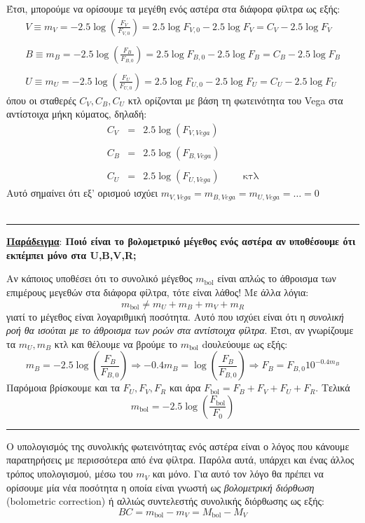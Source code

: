 Έτσι, μπορούμε να ορίσουμε τα μεγέθη ενός αστέρα στα διάφορα φίλτρα ως εξής:
\begin{eqnarray*}
    V \equiv m_V = -2.5 \log \left( \frac{F_V}{F_{V,0}} \right) = 2.5 \log F_{V,0} - 2.5 \log F_V = C_V - 2.5 \log F_V \\\\
    B \equiv m_B = -2.5 \log \left( \frac{F_B}{F_{B,0}} \right) = 2.5 \log F_{B,0} - 2.5 \log F_B = C_B - 2.5 \log F_B \\\\
    U \equiv m_U = -2.5 \log \left( \frac{F_U}{F_{U,0}} \right) = 2.5 \log F_{U,0} - 2.5 \log F_U = C_U - 2.5 \log F_U 
\end{eqnarray*}
όπου οι σταθερές $C_V, C_B, C_U$ κτλ ορίζονται με βάση τη φωτεινότητα του Vega στα αντίστοιχα μήκη κύματος, δηλαδή:
\begin{eqnarray*}
    C_V  &=& 2.5 \log(F_{V, Vega}) \\\\
    C_B  &=& 2.5 \log(F_{B, Vega}) \\\\
    C_U  &=& 2.5 \log(F_{U, Vega}) \hspace{1cm} \text{κτλ}
\end{eqnarray*}
Αυτό σημαίνει ότι εξ' ορισμού ισχύει $\boxed{m_{V,Vega} = m_{B,Vega} = m_{U,Vega} = \dots = 0}$
\\\\
\hrule 
\underline{\textbf{Παράδειγμα}}:
\textbf{Ποιό είναι το βολομετρικό μέγεθος ενός αστέρα αν υποθέσουμε ότι εκπέμπει μόνο στα U,B,V,R;}

Αν κάποιος υποθέσει ότι το συνολικό μέγεθος $m_{\text{bol}}$ είναι απλώς το άθροισμα των επιμέρους μεγεθών στα διάφορα φίλτρα, τότε είναι λάθος! Με άλλα λόγια: $$m_{\text{bol}} \neq m_U + m_B + m_V + m_R$$
γιατί το μέγεθος είναι λογαριθμική ποσότητα. Αυτό που ισχύει είναι ότι η \textit{συνολική ροή θα ισούται με το άθροισμα των ροών στα αντίστοιχα φίλτρα}. Έτσι, αν γνωρίζουμε τα $m_U, m_B$ κτλ και θέλουμε να βρούμε το $m_{\text{bol}}$ dουλεύουμε ως εξής:
$$m_B = -2.5 \log \left( \frac{F_B}{F_{B,0}} \right) \Rightarrow -0.4m_B = \log \left( \frac{F_B}{F_{B,0}} \right) \Rightarrow F_B = F_{B,0} 10^{-0.4m_B}$$
Παρόμοια βρίσκουμε και τα $F_U, F_V, F_R$ και άρα $F_{\text{bol}} = F_B+F_V+F_U+F_R$. Τελικά $$m_{\text{bol}} = -2.5 \log \left( \frac{F_{\text{bol}}}{F_0} \right)$$
\hrule 

Ο υπολογισμός της συνολικής φωτεινότητας ενός αστέρα είναι ο λόγος που κάνουμε παρατηρήσεις με περισσότερα από ένα φίλτρα. Παρόλα αυτά, υπάρχει και ένας άλλος τρόπος υπολογισμού, μέσω του $m_V$ και μόνο. Για αυτό τον λόγο θα πρέπει να ορίσουμε μία νέα ποσότητα η οποία είναι γνωστή ως \textit{βολομετρική διόρθωση} (bolometric correction) ή αλλιώς συντελεστής συνολικής διόρθωσης ως εξής:
\begin{equation}
    \boxed{BC = m_{\text{bol}} - m_V = M_{\text{bol}} - M_V}
\end{equation}

